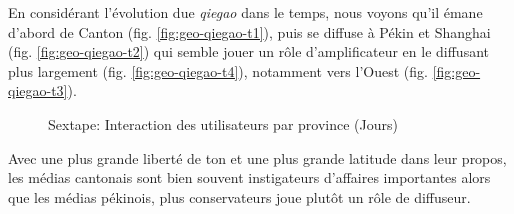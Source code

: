 En considérant l{\textquoteright}évolution due \textit{qiegao} dans le temps, nous voyons qu{\textquoteright}il émane d{\textquoteright}abord de Canton (fig. \ref{fig:geo-qiegao-t1}), puis se diffuse \`a Pékin et Shanghai (fig. \ref{fig:geo-qiegao-t2}) qui semble jouer un r\^ole d{\textquoteright}amplificateur en le diffusant plus largement (fig. \ref{fig:geo-qiegao-t4}), notamment vers l{\textquoteright}Ouest (fig. \ref{fig:geo-qiegao-t3}).  

\begin{figure}[h!]
    \centering
    
  \caption{
    Sextape: Interaction des utilisateurs par province (Jours)
  }
\end{figure}

Avec une plus grande liberté de ton et une plus grande latitude dans leur propos, les médias cantonais sont bien souvent instigateurs d{\textquoteright}affaires importantes alors que les médias pékinois, plus conservateurs joue plut\^ot un r\^ole de diffuseur. 

